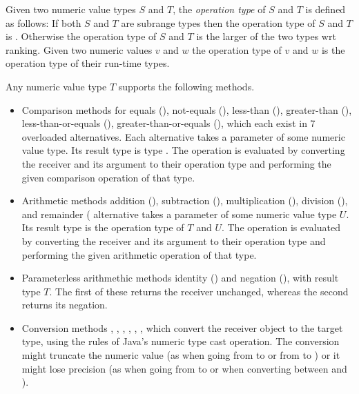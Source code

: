 Given two numeric value types $S$ and $T$, the {\em operation type} of
$S$ and $T$ is defined as follows: If both $S$ and $T$ are subrange
types then the operation type of $S$ and $T$ is .  Otherwise
the operation type of $S$ and $T$ is the larger of the two types wrt
ranking. Given two numeric values $v$ and $w$ the operation type of
$v$ and $w$ is the operation type of their run-time types.

Any numeric value type $T$ supports the following methods.
\begin{itemize}
\item 
Comparison methods for equals (\code{==}), not-equals (\code{!=}),
less-than (\code{<}), greater-than (\code{>}), less-than-or-equals
(\code{<=}), greater-than-or-equals (\code{>=}), which each exist in 7
overloaded alternatives. Each alternative takes a parameter of some
numeric value type. Its result type is type . The
operation is evaluated by converting the receiver and its argument to
their operation type and performing the given comparison operation of
that type.
\item
Arithmetic methods addition (\code{+}), subtraction (\code{-}),
multiplication (\code{*}), division (\code{/}), and remainder
(\lstinline@%@), which each exist in 7 overloaded alternatives. Each
alternative takes a parameter of some numeric value type $U$.  Its
result type is the operation type of $T$ and $U$. The operation is
evaluated by converting the receiver and its argument to their
operation type and performing the given arithmetic operation of that
type.
\item
Parameterless arithmethic methods identity (\code{+}) and negation
(\code{-}), with result type $T$.  The first of these returns the
receiver unchanged, whereas the second returns its negation.
\item
Conversion methods , , ,
, , ,  which
convert the receiver object to the target type, using the rules of
Java's numeric type cast operation. The conversion might truncate the
numeric value (as when going from  to  or from
 to ) or it might lose precision (as when going
from  to  or when converting between
 and ). 
\end{itemize}

